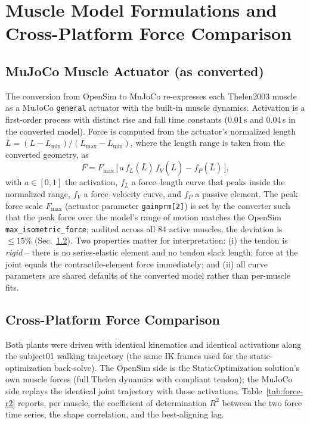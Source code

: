\section{Muscle Model Formulations and Cross-Platform Force Comparison}
\label{sec:muscle-models}

\subsection{MuJoCo Muscle Actuator (as converted)}

The conversion from OpenSim to MuJoCo re-expresses each Thelen2003
muscle as a MuJoCo \texttt{general} actuator with the built-in muscle
dynamics. Activation is a first-order process with distinct rise and
fall time constants (0.01\,s and 0.04\,s in the converted model). Force
is computed from the actuator's normalized length
$\bar{L} = (L - L_{\min}) / (L_{\max} - L_{\min})$, where the length
range is taken from the converted geometry, as
\begin{equation}
  F = F_{\max}\,\bigl[\,a\, f_L(\bar{L})\, f_V(\dot{L}) - f_P(\bar{L})\,\bigr],
  \label{eq:mj-muscle}
\end{equation}
with $a \in [0,1]$ the activation, $f_L$ a force--length curve that
peaks inside the normalized range, $f_V$ a force--velocity curve, and
$f_P$ a passive element. The peak force scale $F_{\max}$ (actuator
parameter \texttt{gainprm[2]}) is set by the converter such that the
peak force over the model's range of motion matches the OpenSim
\texttt{max\_isometric\_force}; audited across all 84 active muscles,
the deviation is $\le 15\%$ (Sec.~\ref{sec:muscle-models-compare}). Two
properties matter for interpretation: (i) the tendon is \emph{rigid} --
there is no series-elastic element and no tendon slack length; force at
the joint equals the contractile-element force immediately; and (ii)
all curve parameters are shared defaults of the converted model rather
than per-muscle fits.

\subsection{Cross-Platform Force Comparison}
\label{sec:muscle-models-compare}

Both plants were driven with identical kinematics and identical
activations along the subject01 walking trajectory (the same IK frames
used for the static-optimization back-solve). The OpenSim side is the
StaticOptimization solution's own muscle forces (full Thelen dynamics
with compliant tendon); the MuJoCo side replays the identical joint
trajectory with those activations. Table~\ref{tab:force-r2} reports, per
muscle, the coefficient of determination $R^2$ between the two force
time series, the shape correlation, and the best-aligning lag.

